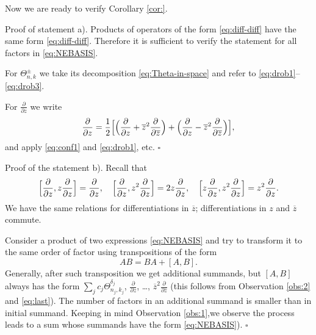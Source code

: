 \documentclass[]{amsart}
\def\ov{\overline}
\def\sm{\smallskip}
\begin{document}
Now we are ready to verify Corollary \ref{cor:}.

\sm

{\sc Proof of statement a).} Products of operators of the form
\eqref{eq:diff-diff} have the same form \eqref{eq:diff-diff}. Therefore it is sufficient to verify the statement for
all factors in \eqref{eq:NEBASIS}. 

For $\Theta_{n,k}^\pm$ we
take its decomposition \eqref{eq:Theta-in-space}
and refer to \eqref{eq:drob1}--\eqref{eq:drob3}.

For $\frac{\partial}{\partial z}$ we write
$$
\frac{\partial}{\partial z}=\frac12\Bigl[
\Bigl(\frac{\partial}{\partial z}+ 
\ov z^2\frac{\partial}{\partial \ov z}\Bigr)
+
\Bigl(\frac{\partial}{\partial z}-
\ov z^2\frac{\partial}{\partial \ov z}\Bigr)
\Bigr],
$$
and apply \eqref{eq:conf1} and \eqref{eq:drob1}, etc.
\hfill $\square$

\sm

{\sc Proof of  the statement b).}
Recall that 
\begin{equation}
\Bigl[\frac{\partial}{\partial z},z\frac{\partial}{\partial z}  \Bigr]=\frac{\partial}{\partial z},
\quad
\Bigl[\frac{\partial}{\partial z},z^2\frac{\partial}{\partial z}  \Bigr]=2z\frac{\partial}{\partial z},\quad
\Bigl[z\frac{\partial}{\partial z},z^2\frac{\partial}{\partial z}  \Bigr]=z^2\frac{\partial}{\partial z}.
\label{eq:last}
\end{equation}
We have the same relations for differentiations in $\ov z$;
differentiations in $z$ and $\ov z$ commute.
 

 
 Consider a product of two
expressions \eqref{eq:NEBASIS}
and try to transform it to the same order of factor
using transpositions of the form
$$
AB=BA+[A,B].
$$  
Generally, after such transposition we get  additional summands,
but $[A,B]$ always has the form $\sum_j c_j \Theta^{\delta_j}_{n_j,k_j}$, 
$\frac{\partial}{\partial z}$, \dots,
 $\ov z^2\frac{\partial}{\partial \ov z}$
 (this follows from Observation \ref{obs:2} and \eqref{eq:last}).
 The number of factors in an additional summand 
 is smaller than in initial summand.  
 Keeping in mind Observation \ref{obs:1},we observe the process leads to a sum whose summands have the form
 \eqref{eq:NEBASIS}).
\hfill $\square$ 
 
 
 
\end{document}
